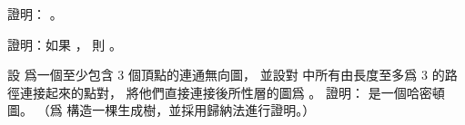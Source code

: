 \startEXERCISE
證明： 。
\stopEXERCISE

\startANSWER
{}
\stopANSWER

\startEXERCISE
證明：如果 ，
則 。
\stopEXERCISE

\startANSWER
{}
\stopANSWER

\startEXERCISE
設  爲一個至少包含 3 個頂點的連通無向圖，
並設對  中所有由長度至多爲 3 的路徑連接起來的點對，
將他們直接連接後所性層的圖爲 。
證明：  是一個哈密頓圖。
（\hint 爲  構造一棵生成樹，並採用歸納法進行證明。）
\stopEXERCISE

\startANSWER
{}
\stopANSWER

\stopsection
